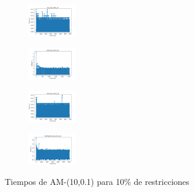 \begin{figure}[H]
\begin{subfigure}
    \end{subfigure}
    \hfill
    \begin{subfigure}
        \centering
        \includegraphics[width=0.234\textwidth]{img/am01/iris_set_const_10_3773969821_time.png}
    \end{subfigure}
    \hfill
    \begin{subfigure}
        \centering
        \includegraphics[width=0.234\textwidth]{img/am01/ecoli_set_const_10_3773969821_time.png}
    \end{subfigure}
    \hfill
    \begin{subfigure}
        \centering
        \includegraphics[width=0.234\textwidth]{img/am01/rand_set_const_10_3773969821_time.png}
    \end{subfigure}
    \hfill
    \begin{subfigure}
        \centering
        \includegraphics[width=0.234\textwidth]{img/am01/newthyroid_set_const_10_3773969821_time.png}
    \end{subfigure}
    \caption{Tiempos de AM-(10,0.1) para 10\% de restricciones}
\end{figure}

\vspace*{\fill}
\newpage
\vspace*{\fill}

